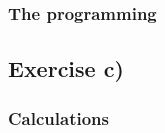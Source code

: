 \documentclass{article}
\begin{document}
\iffalse
    \begin{equation*} \label{eq:fullmatrixeqbackward}
      \begin{bmatrix}
        d_1 & c_1 & 0 & 0 & \dots & 0 \\
        0 & \tilde{d}_2 & c_2 & 0 & \dots & 0 \\
        0 & 0 & \tilde{d}_3 & c_3 & \dots & 0 \\
        \vdots & \vdots & \vdots & \vdots & \ddots & \vdots \\
        0 & 0 & 0 & 0 & \tilde{d}_{n-1} & c_{n-1} \\
        0 & 0 & 0 & 0 & 0 & \tilde{d}_n \\
      \end{bmatrix}
      \begin{bmatrix}
        v_1 \\
        v_2 \\
        v_3 \\
        \vdots \\
        v_{n-1} \\
        v_n \\
      \end{bmatrix}
      =
      \begin{bmatrix}
        \tilde{b}_1 \\
        \tilde{b}_2 \\
        \tilde{b}_3 \\
        \vdots \\
        \tilde{b}_{n-1} \\
        \tilde{b}_n \\
      \end{bmatrix}
    \end{equation*} \\
\fi


  \subsubsection{The programming}




\subsection{Exercise c)} \label{sec:Method c)}

  \subsubsection{Calculations}
\end{document}
